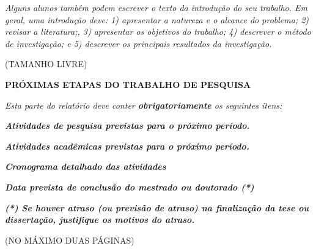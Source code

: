 \documentclass[12pt,a4paper]{article}
\begin{document}
\bigskip

{\itshape
Alguns alunos também podem escrever o texto da introdução do seu trabalho. Em
geral, uma introdução deve: 1) apresentar a natureza e o alcance do problema;
2) revisar a literatura;, 3) apresentar os objetivos do trabalho; 4) descrever
o método de investigação; e 5) descrever os principais resultados da
investigação.}

\vspace{1.5cm}

{\centering
(TAMANHO LIVRE)
\par}

\newpage

\begin{center}
\textbf{\large PRÓXIMAS ETAPAS DO TRABALHO DE PESQUISA}
\end{center}

\vspace{1cm}

\textit{Esta parte do relatório deve conter \textbf{obrigatoriamente}
os seguintes itens:}

\bigskip

\bigskip

{\centering\bfseries\itshape
Atividades de pesquisa previstas para o próximo período.
\par}

\bigskip

{\centering\bfseries\itshape
Atividades acadêmicas previstas para o próximo período.
\par}

\bigskip

{\centering\bfseries\itshape
Cronograma detalhado das atividades
\par}

\bigskip

{\centering\bfseries\itshape
Data prevista de conclusão do mestrado ou doutorado (*)
\par}

\bigskip

\bigskip

{\centering\bfseries\itshape
(*) Se houver atraso (ou previsão de atraso) na finalização da tese ou
dissertação, justifique os motivos do atraso.
\par}

\bigskip
\bigskip

{\centering
(NO MÁXIMO DUAS PÁGINAS)
\par}
\end{document}
